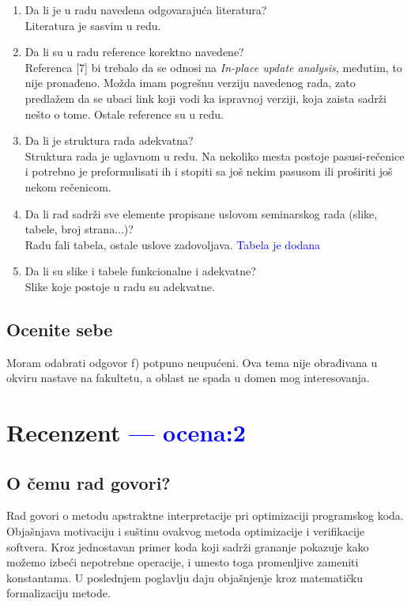 \documentclass[a4paper]{report}
\newcommand{\odgovor}[1]{\textcolor{blue}{#1}}
\begin{document}
\begin{enumerate}
\item Da li je u radu navedena odgovarajuća literatura?\\
	\noindent Literatura je sasvim u redu.

\item Da li su u radu reference korektno navedene?\\
	\noindent Referenca [7] bi trebalo da se odnosi na \textit{In-place update analysis}, međutim, to nije pronađeno. Možda imam pogrešnu verziju navedenog rada, zato predlažem da se ubaci link koji vodi ka ispravnoj verziji, koja zaista sadrži nešto o tome. Ostale reference su u redu.

\item Da li je struktura rada adekvatna?\\
	\noindent Struktura rada je uglavnom u redu. Na nekoliko mesta postoje pasusi-rečenice i potrebno je preformulisati ih i stopiti sa još nekim pasusom ili proširiti još nekom rečenicom.

\item Da li rad sadrži sve elemente propisane uslovom seminarskog rada (slike, tabele, broj strana...)?\\
	\noindent Radu fali tabela, ostale uslove zadovoljava.
	\odgovor{Tabela je dodana}

\item Da li su slike i tabele funkcionalne i adekvatne?\\
	\noindent Slike koje postoje u radu su adekvatne.

\end{enumerate}

\section{Ocenite sebe}

Moram odabrati odgovor f) potpuno neupućeni. Ova tema nije obrađivana u okviru nastave na fakultetu, a oblast ne spada u domen mog interesovanja.

\chapter{Recenzent \odgovor{--- ocena:2} }


\section{O čemu rad govori?}
Rad govori o metodu apstraktne interpretacije pri optimizaciji programskog koda. Objašnjava motivaciju i suštinu ovakvog metoda optimizacije i verifikacije softvera. 
Kroz jednostavan primer koda koji sadrži grananje pokazuje kako možemo izbeći nepotrebne operacije, i umesto toga promenljive zameniti konstantama. 
U poslednjem poglavlju daju objašnjenje kroz matematičku formalizaciju metode.
\end{document}
